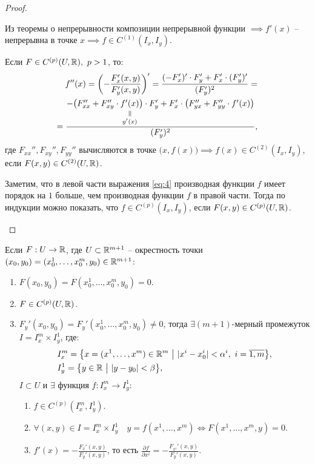 \begin{proof}
\begin{enumerate}
              Из теоремы о непрерывности композиции непрерывной функции $\implies f'(x)$ -- непрерывна в точке $x \implies f \in C^{(1)}(I_x,I_y)$.

              Если $F \in C^{(p)}(U,\mathbb{R}), \ p > 1$, то:
              \begin{multline}\label{eq:4}
                  \quad f''(x) = \left(-\frac{F_x'(x,y)}{F_y'(x,y)}\right)' = \frac{(-F_x')' \cdot F_y' + F_x' \cdot (F_y')'}{(F_y')^2} = \\
                  = \frac{-\big(F_{xx}'' + F_{xy}'' \cdot \equalto{f'(x)}{y'(x)}\big)\cdot F_y' + F_x'\cdot \big(F_{yx}'' + F_{yy}'' \cdot f'(x)\big)}{(F_y')^2},
              \end{multline}
              где $F_{xx}'', F_{xy}'', F_{yy}''$ вычисляются в точке $\big(x,f(x)\big)\implies f(x) \in C^{(2)}(I_x,I_y)$, если $F(x,y) \in C^{(2)}(U,\mathbb{R})$.

              Заметим, что в левой части выражения \ref{eq:4} производная функции $f$ имеет порядок на $1$ больше, чем производная функции $f$ в правой части. Тогда по индукции можно показать, что $f \in C^{(p)}(I_x,I_y)$, если $F(x,y) \in C^{(p)}(U,\mathbb{R})$.
    \end{enumerate}
\end{proof}

\begin{theorem}[О неявной функции вида $F(x^1,\ldots,x^m,y) = 0$]
    Если $F:U \rightarrow \mathbb{R}$, где $U \subset \mathbb{R}^{m+1}$ -- окрестность точки $(x_0,y_0) = (x_0^1, \ldots, x_0^m,y_0) \in \mathbb{R}^{m+1}$:
    \begin{enumerate}
        \item $F(x_0,y_0) = F(x_0^1,\ldots,x_0^m,y_0) = 0$.
        \item $F \in C^{(p)}(U,\mathbb{R})$.
        \item $F_y'(x_0,y_0) = F_y'(x_0^1,\ldots,x_0^m,y_0) \ne 0$, тогда $\exists (m+1)$-мерный промежуток $I = I_x^m \times I_y^1$, где:
              \begin{align*}
                   & I_x^m = \big\{x = (x^1,\ldots,x^m) \in \R^m \ \big| \ |x^i - x_0^i| < \alpha^i, \ i = \overline{1,m}\big\}, \\
                   & I_y^1 = \big\{y \in \R \ \big| \ |y - y_0| < \beta\big\},
              \end{align*}
              $I \subset U$ и $\exists$ функция $f:I_x^m \rightarrow I_y^1:$
              \begin{enumerate}
                  \item $f \in C^{(p)}(I_x^m, I_y^1)$.
                  \item $\forall (x,y) \in I = I_x^m \times I_y^1 \quad y = f(x^1,\ldots,x^m) \iff F(x^1,\ldots,x^m,y) = 0$.
                  \item $f'(x) = -\frac{F_x'(x,y)}{F_y'(x,y)}$, то есть $\frac{\partial f}{\partial x^i} = -\frac{F_{x^i}'(x,y)}{F_y'(x,y)}$.
              \end{enumerate}
    \end{enumerate}
\end{theorem}

